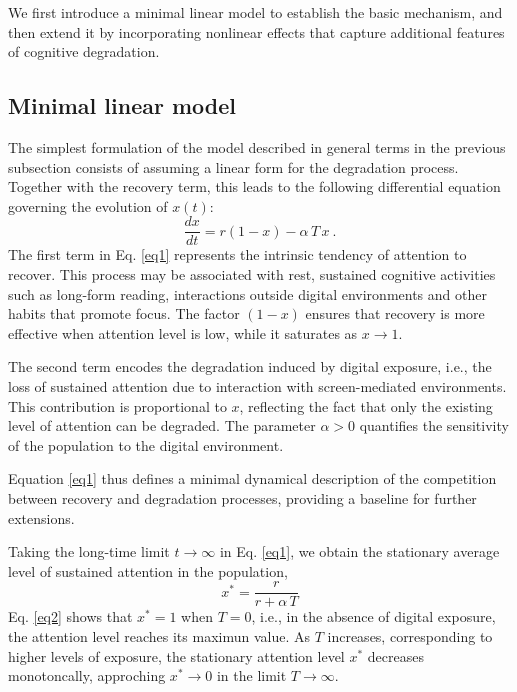 \documentclass[preprint,12pt]{elsarticle}
\begin{document}
We first introduce a minimal linear model to establish the basic mechanism, and then extend it by incorporating nonlinear effects that capture additional features of cognitive degradation.




\subsection{Minimal linear model}

The simplest formulation of the model described in general terms in the previous subsection consists of assuming a linear form for the degradation process. Together with the recovery term, this leads to the following differential equation governing the evolution of $x(t)$:
\begin{equation} \label{eq1}
\frac{dx}{dt}=r(1-x)-\alpha\,T\,x ~.
\end{equation}
\noindent
The first term in Eq. \eqref{eq1} represents the intrinsic tendency of attention to recover. This process may be associated with rest, sustained cognitive activities such as long-form reading, interactions outside digital environments and other habits that promote focus. The factor $(1-x)$ ensures that recovery is more effective when attention level is low, while it saturates as $x\to 1$. 

The second term encodes the degradation induced by digital exposure, i.e., the loss of sustained attention due to interaction with screen-mediated environments. This contribution is proportional to $x$, reflecting the fact that only the existing level of attention can be degraded. The parameter $\alpha>0$ quantifies the sensitivity of the population to the digital environment.

Equation \eqref{eq1} thus defines a minimal dynamical description of the competition between recovery and degradation processes, providing a baseline for further extensions.

Taking the long-time limit $t\to\infty$ in Eq. \eqref{eq1}, we obtain the stationary average level of sustained attention in the population,
\begin{equation}  \label{eq2}
x^{*} = \frac{r}{r + \alpha\,T} 
\end{equation}
\noindent
Eq. \eqref{eq2} shows that $x^{*}=1$ when $T=0$, i.e., in the absence of digital exposure, the attention level reaches its maximun value. As $T$ increases, corresponding to higher levels of exposure, the stationary attention level $x^*$ decreases monotoncally, approching $x^*\to 0$ in the limit $T\to\infty$.
\end{document}
